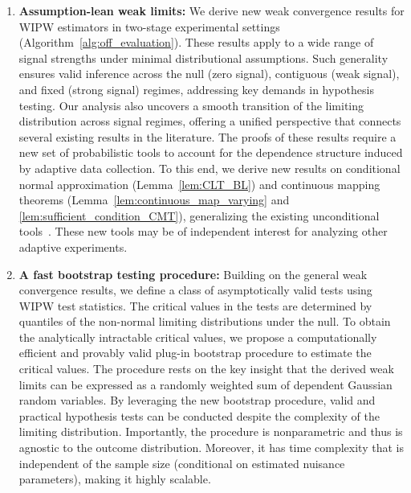 \documentclass[12pt]{article}
\begin{document}
\begin{enumerate}
	\item\textbf{Assumption-lean weak limits:} 
	We derive new weak convergence results for WIPW estimators in two-stage experimental settings (Algorithm~\ref{alg:off_evaluation}). These results apply to a wide range of signal strengths under minimal distributional assumptions. Such generality ensures valid inference across the null (zero signal), contiguous (weak signal), and fixed (strong signal) regimes, addressing key demands in hypothesis testing. Our analysis also uncovers a smooth transition of the limiting distribution across signal regimes, offering a unified perspective that connects several existing results in the literature. The proofs of these results require a new set of probabilistic tools to account for the dependence structure induced by adaptive data collection. To this end, we derive new results on conditional normal approximation (Lemma~\ref{lem:CLT_BL}) and continuous mapping theorems (Lemma~\ref{lem:continuous_map_varying} and \ref{lem:sufficient_condition_CMT}), generalizing the existing unconditional tools~\citep{chatterjee2008multivariate,meckes2009stein}. These new tools may be of independent interest for analyzing other adaptive experiments.
	\item\textbf{A fast bootstrap testing procedure:} 
	Building on the general weak convergence results, we define a class of asymptotically valid tests using WIPW test statistics. The critical values in the tests are determined by quantiles of the non-normal limiting distributions under the null. To obtain the analytically intractable critical values, we propose a computationally efficient and provably valid plug-in bootstrap procedure to estimate the critical values. The procedure rests on the key insight that the derived weak limits can be expressed as a randomly weighted sum of dependent Gaussian random variables. By leveraging the new bootstrap procedure, valid and practical hypothesis tests can be conducted despite the complexity of the limiting distribution. Importantly, the procedure is nonparametric and thus is agnostic to the outcome distribution. Moreover, it has time complexity that is independent of the sample size (conditional on estimated nuisance parameters), making it highly scalable. 
\end{enumerate}
\end{document}
